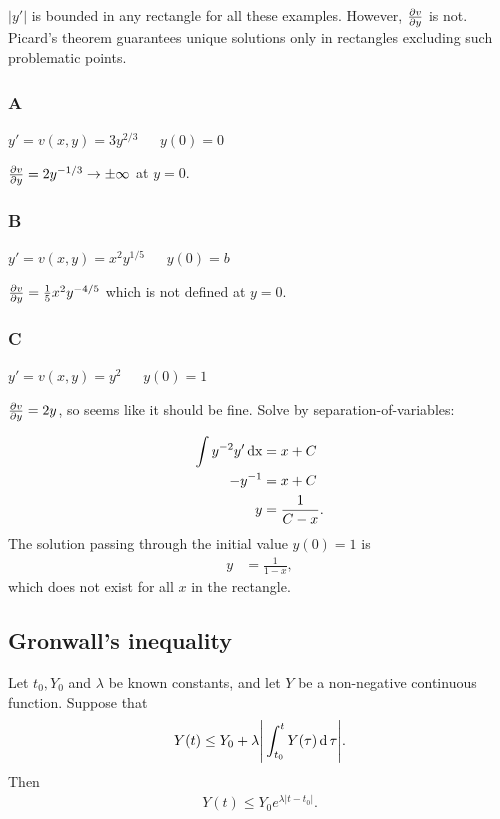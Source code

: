$|y'|$ is bounded in any rectangle for all these examples. However,
$\frac{\partial v}{\partial y}$ is not. Picard's theorem guarantees unique solutions only in
rectangles excluding such problematic points.

\subsubsection{A}
$y' = v(x, y) = 3y^{2/3}  ~~~~~~~ y(0) = 0$

$\frac{\partial v}{\partial y} = 2y^{-1/3} \to \pm \infty$ at $y=0$.


\subsubsection{B}
$y' = v(x, y) = x^2y^{1/5} ~~~~~~~ y(0) = b$

$\frac{\partial v}{\partial y} = \frac{1}{5}x^2y^{-4/5}$ which is not defined at $y=0$.

\subsubsection{C}
$y' = v(x, y) = y^2       ~~~~~~~ y(0) = 1$

$\frac{\partial v}{\partial y} = 2y$, so seems like it should be fine. Solve by
separation-of-variables:

\begin{align*}
  \int y^{-2} y' \operatorname{\text{dx}} &= x + C\\
  -y^{-1}            &= x + C\\
  y                 &= \frac{1}{C - x}.
\end{align*}
The solution passing through the initial value $y(0) = 1$ is
\begin{align*}
  y                  &= \frac{1}{1 - x},
\end{align*}
which does not exist for all $x$ in the rectangle.

\newpage

\subsection{Gronwall's inequality}

\begin{theorem*}
  Let $t_0, Y_0$ and $\lambda$ be known constants, and let $Y$ be a non-negative
  continuous function. Suppose that
  \begin{align*}
    Y(t) \leq Y_0 + \lambda\Bigg|\int_{t_0}^t Y(\tau) \operatorname{\text{d}}\tau\Bigg|.
  \end{align*}
  Then
  \begin{align*}
    Y(t) \leq Y_0e^{\lambda|t - t_0|}.
  \end{align*}
\end{theorem*}

